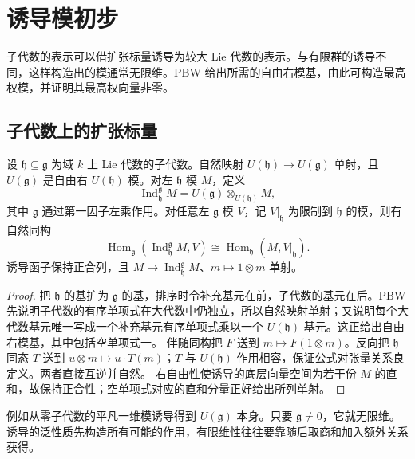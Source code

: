 
\section{诱导模初步}
\label{b5:sec:1504}


%
%
%

子代数的表示可以借扩张标量诱导为较大 Lie 代数的表示。与有限群的诱导不同，这样构造出的模通常无限维。PBW 给出所需的自由右模基，由此可构造最高权模，并证明其最高权向量非零。

\subsection{子代数上的扩张标量}
\label{b5:subsec:1504:01}

\begin{theorem}\label{b5:thm:lie-induction-adjunction}
	设 \(\mathfrak h\subseteq\mathfrak g\) 为域 \(k\) 上 Lie 代数的子代数。自然映射 \(U(\mathfrak h)\to U(\mathfrak g)\) 单射，且 \(U(\mathfrak g)\) 是自由右 \(U(\mathfrak h)\) 模。对左 \(\mathfrak h\) 模 \(M\)，定义
	\[
		\operatorname{Ind}_{\mathfrak h}^{\mathfrak g}M =U(\mathfrak g)\otimes_{U(\mathfrak h)}M,
	\]
	其中 \(\mathfrak g\) 通过第一因子左乘作用。对任意左 \(\mathfrak g\) 模 \(V\)，记 \(V|_{\mathfrak h}\) 为限制到 \(\mathfrak h\) 的模，则有自然同构
	\[
		\operatorname{Hom}_{\mathfrak g} \left(\operatorname{Ind}_{\mathfrak h}^{\mathfrak g}M,V\right) \cong \operatorname{Hom}_{\mathfrak h}(M,V|_{\mathfrak h}).
	\]
	诱导函子保持正合列，且 \(M\to\operatorname{Ind}_{\mathfrak h}^{\mathfrak g}M\)、\(m\mapsto1\otimes m\) 单射。
\end{theorem}
\begin{proof}
	把 \(\mathfrak h\) 的基扩为 \(\mathfrak g\) 的基，排序时令补充基元在前，子代数的基元在后。PBW 先说明子代数的有序单项式在大代数中仍独立，所以自然映射单射；又说明每个大代数基元唯一写成一个补充基元有序单项式乘以一个 \(U(\mathfrak h)\) 基元。这正给出自由右模基，其中包括空单项式一。 伴随同构把 \(F\) 送到 \(m\mapsto F(1\otimes m)\)。反向把 \(\mathfrak h\) 同态 \(T\) 送到 \(u\otimes m\mapsto u\cdot T(m)\)；\(T\) 与 \(U(\mathfrak h)\) 作用相容，保证公式对张量关系良定义。两者直接互逆并自然。 右自由性使诱导的底层向量空间为若干份 \(M\) 的直和，故保持正合性；空单项式对应的直和分量正好给出所列单射。
\end{proof}
例如从零子代数的平凡一维模诱导得到 \(U(\mathfrak g)\) 本身。只要 \(\mathfrak g\ne0\)，它就无限维。诱导的泛性质先构造所有可能的作用，有限维性往往要靠随后取商和加入额外关系获得。

